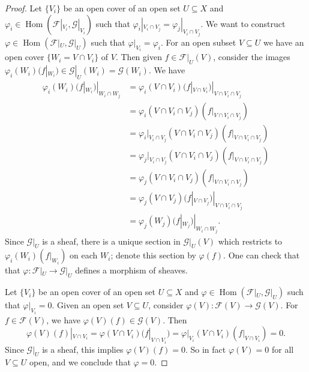 \documentclass[12pt]{article}
\renewcommand{\phi}{\varphi}
\newcommand{\<}{\langle}
\renewcommand{\>}{\rangle}
\newcommand{\FF}{\mathcal{F}}
\newcommand{\GG}{\mathcal{G}}
\DeclareMathOperator{\Hom}{Hom}
\begin{document}
\begin{proof}
    Let $\{V_i\}$ be an open cover of an open set $U \subseteq X$ and $\phi_i \in \Hom(\FF|_{V_i}, \GG|_{V_i})$ such that $\phi_i|_{V_i \cap V_j} = \phi_j|_{V_i \cap V_j}$. We want to construct $\phi \in \Hom(\FF|_U, \GG|_U)$ such that $\phi|_{V_i} = \phi_i$. For an open subset $V \subseteq U$ we have an open cover $\{W_i = V \cap V_i\}$ of $V$. Then given $f \in \FF|_U(V)$, consider the images $\phi_i(W_i)(f|_{W_i}) \in \GG|_U(W_i) = \GG(W_i)$. We have
    \begin{align*}
        \phi_i(W_i)(f|_{W_i})|_{W_i \cap W_j}
            &= \phi_i(V \cap V_i)(f|_{V \cap V_i})|_{V \cap V_i \cap V_j} \\
            &= \phi_i(V \cap V_i \cap V_j)(f|_{V \cap V_i \cap V_j}) \\
            &= \phi_i|_{V_i \cap V_j}(V \cap V_i \cap V_j)(f|_{V \cap V_i \cap V_j}) \\
            &= \phi_j|_{V_i \cap V_j}(V \cap V_i \cap V_j)(f|_{V \cap V_i \cap V_j}) \\
            &= \phi_j(V \cap V_i \cap V_j)(f|_{V \cap V_i \cap V_j}) \\
            &= \phi_j(V \cap V_j)(f|_{V \cap V_j})|_{V \cap V_i \cap V_j} \\
            &= \phi_j(W_j)(f|_{W_j})|_{W_i \cap W_j}.
    \end{align*}
    Since $\GG|_U$ is a sheaf, there is a unique section in $\GG|_U(V)$ which restricts to $\phi_i(W_i)(f|_{W_i})$ on each $W_i$; denote this section by $\phi(f)$. One can check that that $\phi : \FF|_U \to \GG|_U$ defines a morphism of sheaves.

    Let $\{V_i\}$ be an open cover of an open set $U \subseteq X$ and $\phi \in \Hom(\FF|_U, \GG|_U)$ such that $\phi|_{V_i} = 0$. Given an open set $V \subseteq U$, consider $\phi(V) : \FF(V) \to \GG(V)$. For $f \in \FF(V)$, we have $\phi(V)(f) \in \GG(V)$. Then
    \[
        \phi(V)(f)|_{V \cap V_i}
            = \phi(V \cap V_i)(f|_{V \cap V_i})
            = \phi|_{V_i}(V \cap V_i)(f|_{V \cap V_i})
            = 0.
    \]
    Since $\GG|_U$ is a sheaf, this implies $\phi(V)(f) = 0$. So in fact $\phi(V) = 0$ for all $V \subseteq U$ open, and we conclude that $\phi = 0$.

\end{proof}
\end{document}
